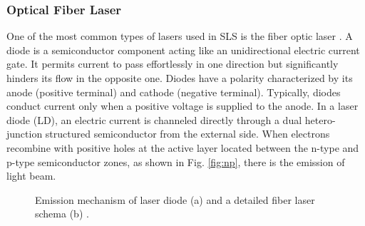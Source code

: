 \subsubsection{Optical Fiber Laser}
\label{sssec:fiberlaser}
One of the most common types of lasers used in SLS is the fiber optic laser \cite{milewski_additive_2017}. A diode is a semiconductor component acting like an unidirectional electric current gate. It permits current to pass effortlessly in one direction but significantly hinders its flow in the opposite one. Diodes have a polarity characterized by its anode (positive terminal) and cathode (negative terminal). Typically, diodes conduct current only when a positive voltage is supplied to the anode. In a laser diode (LD), an electric current is channeled directly through a dual hetero-junction structured semiconductor from the external side. When electrons recombine with positive holes at the active layer located between the n-type and p-type semiconductor zones, as shown in Fig. \ref{fig:np}, there is the emission of light beam.
\begin{figure}
    \centering
    \qquad
    \caption[Laser diode and fiber laser.]{Emission mechanism of laser diode (a) and a detailed fiber laser schema (b) \cite{katayama_fundamentals_2020}.}
    
\end{figure}
